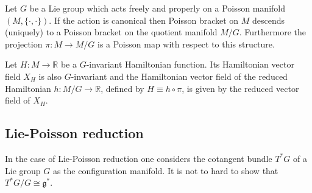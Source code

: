 	
	\begin{theorem}
		Let $G$ be a Lie group which acts freely and properly on a Poisson manifold $(M, \{\cdot, \cdot\})$. If the action is canonical then Poisson bracket on $M$ descends (uniquely) to a Poisson bracket on the quotient manifold $M/G$. Furthermore the projection $\pi:M\rightarrow M/G$ is a Poisson map with respect to this structure.
	\end{theorem}
	\begin{property}
		Let $H:M\rightarrow\mathbb{R}$ be a $G$-invariant Hamiltonian function. Its Hamiltonian vector field $X_H$ is also $G$-invariant and the Hamiltonian vector field of the reduced Hamiltonian $h:M/G\rightarrow\mathbb{R}$, defined by $H\equiv h\circ\pi$, is given by the reduced vector field of $X_H$.
	\end{property}

\subsection{Lie-Poisson reduction}

	In the case of Lie-Poisson reduction one considers the cotangent bundle $T^*G$ of a Lie group $G$ as the configuration manifold. It is not to hard to show that $T^*G/G\cong\mathfrak{g}^*$.

